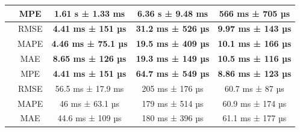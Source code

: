 \begin{table}[!htp]
\begin{tabular}{|c|c|ccc|}
        \rowcolor[HTML]{EFEFEF}
        \multirow{-4}{*}{\cellcolor[HTML]{C0C0C0}ARIMA}   & MPE                                               & \multicolumn{1}{c|}{\cellcolor[HTML]{EFEFEF}1.61 s ± 1.33 ms}           & \multicolumn{1}{c|}{\cellcolor[HTML]{EFEFEF}6.36 s ± 9.48 ms}          & 566 ms ± 705 µs           \\ \hline
        \cellcolor[HTML]{C0C0C0}                          & RMSE                                              & \multicolumn{1}{c|}{\textbf{4.41 ms ± 151 µs}}                          & \multicolumn{1}{c|}{\textbf{31.2 ms ± 526 µs}}                         & \textbf{9.97 ms ± 143 µs} \\ \cline{2-5}
        \rowcolor[HTML]{EFEFEF}
        \cellcolor[HTML]{C0C0C0}                          & MAPE                                              & \multicolumn{1}{c|}{\cellcolor[HTML]{EFEFEF}\textbf{4.46 ms ± 75.1 µs}} & \multicolumn{1}{c|}{\cellcolor[HTML]{EFEFEF}\textbf{19.5 ms ± 409 µs}} & \textbf{10.1 ms ± 166 µs} \\ \cline{2-5}
        \cellcolor[HTML]{C0C0C0}                          & MAE                                               & \multicolumn{1}{c|}{\textbf{8.65 ms ± 126 µs}}                          & \multicolumn{1}{c|}{\textbf{19.3 ms ± 149 µs}}                         & \textbf{10.5 ms ± 116 µs} \\ \cline{2-5}
        \rowcolor[HTML]{EFEFEF}
        \multirow{-4}{*}{\cellcolor[HTML]{C0C0C0}ReW}     & MPE                                               & \multicolumn{1}{c|}{\cellcolor[HTML]{EFEFEF}\textbf{4.41 ms ± 151 µs}}  & \multicolumn{1}{c|}{\cellcolor[HTML]{EFEFEF}\textbf{64.7 ms ± 549 µs}} & \textbf{8.86 ms ± 123 µs} \\ \hline
        \cellcolor[HTML]{C0C0C0}                          & RMSE                                              & \multicolumn{1}{c|}{56.5 ms ± 17.9 ms}                                  & \multicolumn{1}{c|}{205 ms ± 176 µs}                                   & 60.7 ms ± 87 µs           \\ \cline{2-5}
        \rowcolor[HTML]{EFEFEF}
        \cellcolor[HTML]{C0C0C0}                          & MAPE                                              & \multicolumn{1}{c|}{\cellcolor[HTML]{EFEFEF}46 ms ± 63.1 µs}            & \multicolumn{1}{c|}{\cellcolor[HTML]{EFEFEF}179 ms ± 514 µs}           & 60.9 ms ± 174 µs          \\ \cline{2-5}
        \cellcolor[HTML]{C0C0C0}                          & MAE                                               & \multicolumn{1}{c|}{44.6 ms ± 109 µs}                                   & \multicolumn{1}{c|}{180 ms ± 396 µs}                                   & 61.1 ms ± 177 µs          \\ \cline{2-5}

\end{tabular}
\end{table}
